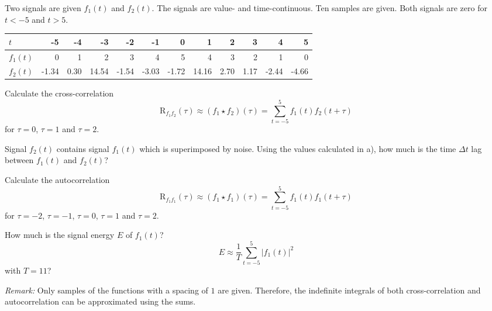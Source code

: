 \begin{question}[subtitle={Cross-Correlation and Autocorrelation}]
	Two signals are given $f_1(t)$ and $f_2(t)$. The signals are value- and time-continuous. Ten samples are given. Both signals are zero for $t < -5$ and $t > 5$.
	\begin{table}[H]
		\centering
		\begin{tabular}{|l|r|r|r|r|r|r|r|r|r|r|r|}
			\hline
			$t$ & -5 & -4 & -3 & -2 & -1 & 0 & 1 & 2 & 3 & 4 & 5 \\
			\hline
			\hline
			$f_1(t)$ & 0 & 1 & 2 & 3 & 4 & 5 & 4 & 3 & 2 & 1 & 0 \\
			$f_2(t)$ & -1.34 & 0.30 & 14.54 & -1.54 & -3.03 & -1.72 & 14.16 & 2.70 & 1.17 & -2.44 & -4.66 \\
			\hline
		\end{tabular}
	\end{table}
	\begin{tasks}
		\task
		Calculate the cross-correlation
		\begin{equation*}
			\mathrm{R}_{f_1 f_2}(\tau) \approx \left(f_1 \star f_2\right)(\tau) = \sum\limits_{t=-5}^{5} f_1(t) f_2(t + \tau)
		\end{equation*}
		for $\tau = 0$, $\tau = 1$ and $\tau = 2$.
		
		\task
		Signal $f_2(t)$ contains signal $f_1(t)$ which is superimposed by noise. Using the values calculated in a), how much is the time $\Delta t$ lag between $f_1(t)$ and $f_2(t)$?
		
		\task
		Calculate the autocorrelation
		\begin{equation*}
			\mathrm{R}_{f_1 f_1}(\tau) \approx \left(f_1 \star f_1\right)(\tau) = \sum\limits_{t=-5}^{5} f_1(t) f_1(t + \tau)
		\end{equation*}
		for $\tau = -2$, $\tau = -1$, $\tau = 0$, $\tau = 1$ and $\tau = 2$.
		
		\task
		How much is the signal energy $E$ of $f_1(t)$?
		\begin{equation*}
			E \approx \frac{1}{T} \sum\limits_{t=-5}^{5} \left|f_1(t)\right|^2
		\end{equation*}
		with $T = 11$?
	\end{tasks}

	\textit{Remark:} Only samples of the functions with a spacing of $1$ are given. Therefore, the indefinite integrals of both cross-correlation and autocorrelation can be approximated using the sums.
\end{question}

